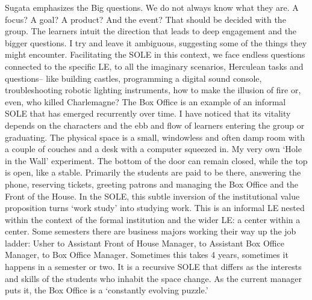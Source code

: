 Sugata emphasizes the Big questions. We do not always know what they
are. A focus? A goal? A product? And the event? That should be decided
with the group. The learners intuit the direction that leads to deep
engagement and the bigger questions. I try and leave it ambiguous,
suggesting some of the things they might encounter. Facilitating the
SOLE in this context, we face endless questions connected to the
specific LE, to all the imaginary scenarios, Herculean tasks and
questions-- like building castles, programming a digital sound console,
troubleshooting robotic lighting instruments, how to make the illusion
of fire or, even, who killed Charlemagne? The Box Office is an example
of an informal SOLE that has emerged recurrently over time. I have
noticed that its vitality depends on the characters and the ebb and flow
of learners entering the group or graduating. The physical space is a
small, windowless and often damp room with a couple of couches and a
desk with a computer squeezed in. My very own `Hole in the Wall'
experiment. The bottom of the door can remain closed, while the top is
open, like a stable. Primarily the students are paid to be there,
answering the phone, reserving tickets, greeting patrons and managing
the Box Office and the Front of the House. In the SOLE, this subtle
inversion of the institutional value proposition turns `work study' into
studying work. This is an informal LE nested within the context of the
formal institution and the wider LE: a center within a center. Some
semesters there are business majors working their way up the job ladder:
Usher to Assistant Front of House Manager, to Assistant Box Office
Manager, to Box Office Manager. Sometimes this takes 4 years, sometimes
it happens in a semester or two. It is a recursive SOLE that differs as
the interests and skills of the students who inhabit the space change.
As the current manager puts it, the Box Office is a `constantly evolving
puzzle.'

